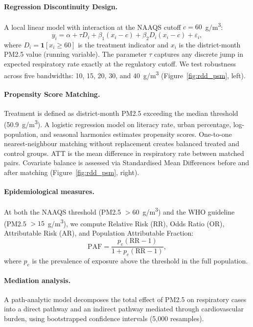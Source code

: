 \documentclass{article}
\begin{document}
\paragraph{Regression Discontinuity Design.}
A local linear model with interaction at the NAAQS cutoff $c = 60$~\textmu{}g/m\textsuperscript{3}:
\[
  y_i = \alpha + \tau D_i + \beta_1(x_i - c) + \beta_2 D_i(x_i - c) + \varepsilon_i,
\]
where $D_i = \mathbf{1}[x_i \geq 60]$ is the treatment indicator and $x_i$ is the
district-month PM2.5 value (running variable). The parameter $\tau$ captures any
discrete jump in expected respiratory rate exactly at the regulatory cutoff. We test
robustness across five bandwidths: 10, 15, 20, 30, and 40~\textmu{}g/m\textsuperscript{3}
(Figure~\ref{fig:rdd_psm}, left).

\paragraph{Propensity Score Matching.}
Treatment is defined as district-month PM2.5 exceeding the median threshold
(50.9~\textmu{}g/m\textsuperscript{3}). A logistic regression model on literacy rate,
urban percentage, log-population, and seasonal harmonics estimates propensity scores.
One-to-one nearest-neighbour matching without replacement creates balanced treated and
control groups. ATT is the mean difference in respiratory rate between matched pairs.
Covariate balance is assessed via Standardised Mean Differences before and after matching
(Figure~\ref{fig:rdd_psm}, right).

\paragraph{Epidemiological measures.}
At both the NAAQS threshold (PM2.5 $> 60$~\textmu{}g/m\textsuperscript{3}) and the WHO
guideline (PM2.5 $> 15$~\textmu{}g/m\textsuperscript{3}), we compute Relative Risk (RR),
Odds Ratio (OR), Attributable Risk (AR), and Population Attributable Fraction:
\[
  \mathrm{PAF} = \frac{p_e(\mathrm{RR} - 1)}{1 + p_e(\mathrm{RR} - 1)},
\]
where $p_e$ is the prevalence of exposure above the threshold in the full population.

\paragraph{Mediation analysis.}
A path-analytic model \cite{baron1986} decomposes the total effect of PM2.5 on respiratory
cases into a direct pathway and an indirect pathway mediated through cardiovascular burden,
using bootstrapped confidence intervals (5,000 resamples).
\end{document}
